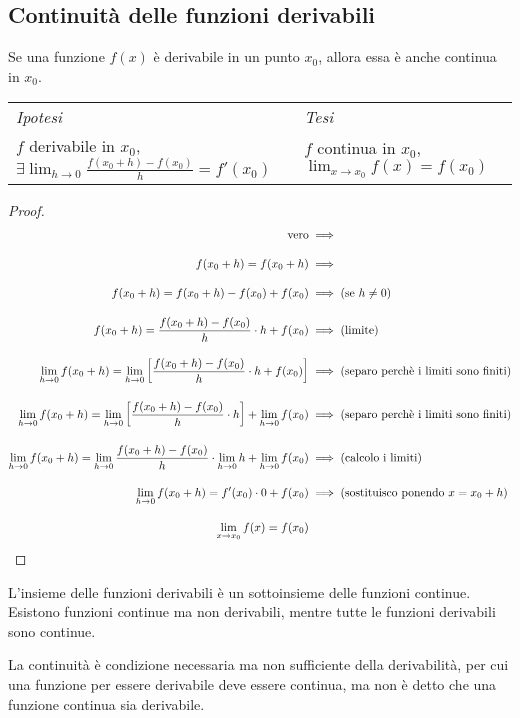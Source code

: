 \documentclass{book}     %
\begin{document}
\subsection{Continuità delle funzioni derivabili}
\begin{shadedTheorem}
    Se una funzione $f(x)$ è derivabile in un punto $x_0$, allora essa è anche continua in $x_0$.
\end{shadedTheorem}
\begin{tabular}{m{}m{}}
    \textit{Ipotesi} & \textit{Tesi}  \\
    $f$ derivabile in $x_0$, $\exists \lim_{h\to 0}\frac{f(x_0+h)-f(x_0)}{h}=f'(x_0)$ & $f$ continua in $x_0$, $\lim_{x\to x_0}f(x)=f(x_0)$ 
\end{tabular}
\begin{proof}
    \[  \begingroup
        \addtolength{\jot}{1em}
        \begin{aligned}
        \text{vero} & \implies\\
        f(x_0+h)=f(x_0+h) & \implies\\
        f(x_0+h)=f(x_0+h)-f(x_0)+f(x_0)& \implies (\text{se }h\neq 0)\\
        f(x_0+h)=\frac{f(x_0+h)-f(x_0)}{h}\cdot h+f(x_0)& \implies (\text{limite})\\
        \lim_{h\to0}f(x_0+h)=\lim_{h\to0}\left[\frac{f(x_0+h)-f(x_0)}{h}\cdot h+f(x_0)\right] &  \implies (\text{separo perchè i limiti sono finiti})\\
        \lim_{h\to0}f(x_0+h)=\lim_{h\to0}\left[\frac{f(x_0+h)-f(x_0)}{h}\cdot h\right]+\lim_{h\to0}f(x_0) &  \implies (\text{separo perchè i limiti sono finiti})\\
        \lim_{h\to0}f(x_0+h)=\lim_{h\to0}\frac{f(x_0+h)-f(x_0)}{h}\cdot \lim_{h\to0} h+\lim_{h\to0}f(x_0) &  \implies (\text{calcolo i limiti})\\
        \lim_{h\to0}f(x_0+h)=f'(x_0)\cdot 0+f(x_0) &  \implies (\text{sostituisco ponendo }x=x_0+h)\\
        \lim_{x\to x_0}f(x)=f(x_0) 
    \end{aligned}
    \endgroup
    \]
\end{proof}
\begin{oss}[1]
    L'insieme delle funzioni derivabili è un sottoinsieme delle funzioni continue. Esistono funzioni continue ma non derivabili, mentre tutte le funzioni derivabili sono continue.
\end{oss}
\begin{oss}[2]
    La continuità è condizione necessaria ma non sufficiente della derivabilità, per cui una funzione per essere derivabile deve essere continua, ma non è detto che una funzione continua sia derivabile.
\end{oss}
\end{document}
